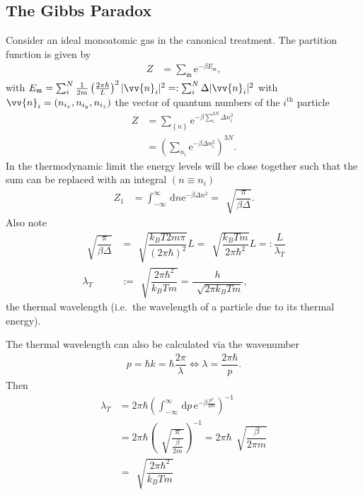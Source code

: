 \documentclass[a4paper,10pt]{article}
\newcommand{\td}{\,\text{d}}
\numberwithin{equation}{section}
\begin{document}
\begin{multicols}{2}
\subsection{The Gibbs Paradox}
Consider an ideal monoatomic gas in the canonical treatment.
The partition function is given by
\begin{align} 
  Z &= \sum_{\mathfrak{m}}^{}\text{e}^{-\beta E_\mathfrak{m}}
,\end{align} 
with $E_\mathfrak{m}=\sum_{i}^{N}\tfrac{1}{2m}\left(\tfrac{2\pi \hbar }{L}\right)^2|\vv{n}_i|^2=:\sum_{i}^{N}\Delta |\vv{n}_i|^2$ with $\vv{n}_i=(n_{i_x}, n_{i_y}, n_{i_z})$ the vector of quantum numbers of the $i^\text{th}$ particle
\begin{align} 
  Z &= \sum_{ \left\{n\right\}}^{}\text{e}^{-\beta \sum_{i}^{3N}\Delta n_i^2}\\
    &= \left(\sum_{n_i}^{}\text{e}^{-\beta \Delta n_i^2}\right)^{3N}
.\end{align} 
In the thermodynamic limit the energy levels will be close together such that the sum can be replaced with an integral $(n\equiv n_i)$ 
\begin{align} 
  Z_1 &= \int_{-\infty}^{\infty}\td n \text{e}^{-\beta \Delta n^2} = \,\sqrt[]{\dfrac{\pi }{\beta \Delta }}
.\end{align} 
Also note
\begin{align} 
  \,\sqrt[]{\dfrac{\pi }{\beta \Delta }} &= \,\sqrt[]{\dfrac{k_BT2m\pi }{(2\pi \hbar )^2}}L = \,\sqrt[]{\dfrac{k_BTm}{2\pi \hbar ^2}}L =: \dfrac{L}{\lambda _T}\\
  \lambda _T &:= \,\sqrt[]{\dfrac{2\pi \hbar ^2}{k_BTm}} = \dfrac{h}{\,\sqrt[]{2\pi k_BTm}}
,\end{align} 
the thermal wavelength (i.e.\ the wavelength of a particle due to its thermal energy).

\footnotesize
The thermal wavelength can also be calculated via the wavenumber
\begin{align} 
  p = \hbar k = \hbar \dfrac{2\pi }{\lambda } \Leftrightarrow \lambda =\dfrac{2\pi \hbar }{p}
.\end{align} 
Then
\begin{align} 
  \lambda _T&= 2\pi \hbar \left(\int_{-\infty}^{\infty}\td p\, \text{e}^{-\beta \tfrac{p^2}{2m}}\right)^{-1}\\
            &= 2\pi \hbar \left(\,\sqrt[]{\dfrac{\pi }{\tfrac{\beta }{2m} }}\right)^{-1} = 2\pi \hbar \,\sqrt[]{\dfrac{\beta }{2\pi m}}\\
            &= \,\sqrt[]{\dfrac{2\pi \hbar ^2}{k_BTm}}
\end{align} 


\end{multicols}
\end{document}
